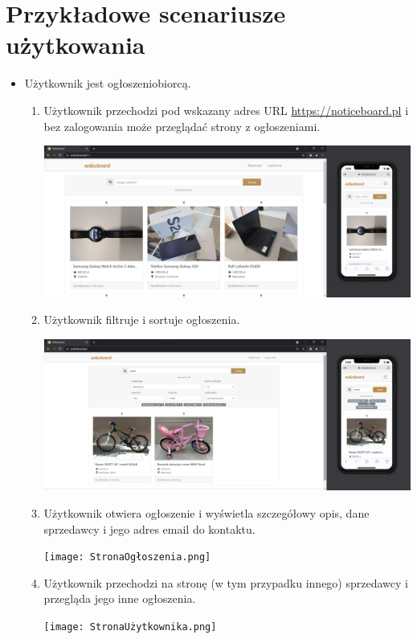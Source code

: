 \documentclass{article}
\begin{document}
\section{Przykładowe scenariusze użytkowania}
\begin{itemize}
    \item Użytkownik jest ogłoszeniobiorcą.
        \begin{enumerate}
            \item Użytkownik przechodzi pod wskazany adres URL  \href{https://noticeboard.pl}{https://noticeboard.pl} i bez zalogowania może przeglądać strony z ogłoszeniami.
                \begin{center}
                
                 \includegraphics[width=15.5cm]{StronaGłówna.png}
                \end{center}
            \item Użytkownik filtruje i sortuje ogłoszenia.
            \begin{center}
                    \centering  \includegraphics[width=15.5cm]{Filtrowanie.png}
                \end{center}
            \item Użytkownik otwiera ogłoszenie i wyświetla szczegółowy opis, dane sprzedawcy i jego adres email do kontaktu.
            \begin{center}
                    \centering  \texttt{[image: StronaOgłoszenia.png]}
            \end{center}
            \item Użytkownik przechodzi na stronę (w tym przypadku innego) sprzedawcy i przegląda jego inne ogłoszenia.
            \begin{center}
                    \centering  \texttt{[image: StronaUżytkownika.png]}
            \end{center}
        \end{enumerate}
        

\end{itemize}
\end{document}
